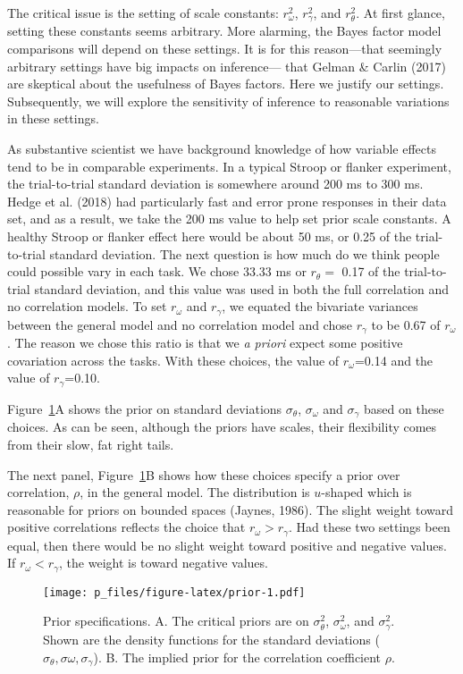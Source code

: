 \documentclass[english,man]{apa6}
\theoremstyle{definition}
\theoremstyle{definition}
\theoremstyle{remark}
\begin{document}
The critical issue is the setting of scale constants: \(r^2_\omega\),
\(r^2_\gamma\), and \(r^2_\theta\). At first glance, setting these
constants seems arbitrary. More alarming, the Bayes factor model
comparisons will depend on these settings. It is for this reason---that
seemingly arbitrary settings have big impacts on inference--- that
Gelman \& Carlin (2017) are skeptical about the usefulness of Bayes
factors. Here we justify our settings. Subsequently, we will explore the
sensitivity of inference to reasonable variations in these settings.

As substantive scientist we have background knowledge of how variable
effects tend to be in comparable experiments. In a typical Stroop or
flanker experiment, the trial-to-trial standard deviation is somewhere
around 200 ms to 300 ms. Hedge et al. (2018) had particularly fast and
error prone responses in their data set, and as a result, we take the
200 ms value to help set prior scale constants. A healthy Stroop or
flanker effect here would be about 50 ms, or 0.25 of the trial-to-trial
standard deviation. The next question is how much do we think people
could possible vary in each task. We chose 33.33 ms or \(r_\theta=\)
0.17 of the trial-to-trial standard deviation, and this value was used
in both the full correlation and no correlation models. To set
\(r_\omega\) and \(r_\gamma\), we equated the bivariate variances
between the general model and no correlation model and chose
\(r_\gamma\) to be 0.67 of \(r_\omega\). The reason we chose this ratio
is that we \emph{a priori} expect some positive covariation across the
tasks. With these choices, the value of \(r_\omega\)=0.14 and the value
of \(r_\gamma\)=0.10.

Figure~\ref{fig:prior}A shows the prior on standard deviations
\(\sigma_\theta\), \(\sigma_\omega\) and \(\sigma_\gamma\) based on
these choices. As can be seen, although the priors have scales, their
flexibility comes from their slow, fat right tails.

The next panel, Figure~\ref{fig:prior}B shows how these choices specify
a prior over correlation, \(\rho\), in the general model. The
distribution is \(u\)-shaped which is reasonable for priors on bounded
spaces (Jaynes, 1986). The slight weight toward positive correlations
reflects the choice that \(r_\omega>r_\gamma\). Had these two settings
been equal, then there would be no slight weight toward positive and
negative values. If \(r_\omega<r_\gamma\), the weight is toward negative
values.

\begin{figure}[htbp]
\centering
\texttt{[image: p\_files/figure-latex/prior-1.pdf]}
\caption{\label{fig:prior}Prior specifications. A. The critical priors are
on \(\sigma^2_\theta\), \(\sigma^2_\omega\), and \(\sigma^2_\gamma\).
Shown are the density functions for the standard deviations
(\(\sigma_\theta, \sigma\omega, \sigma_\gamma\)). B. The implied prior
for the correlation coefficient \(\rho\).}
\end{figure}
\end{document}
